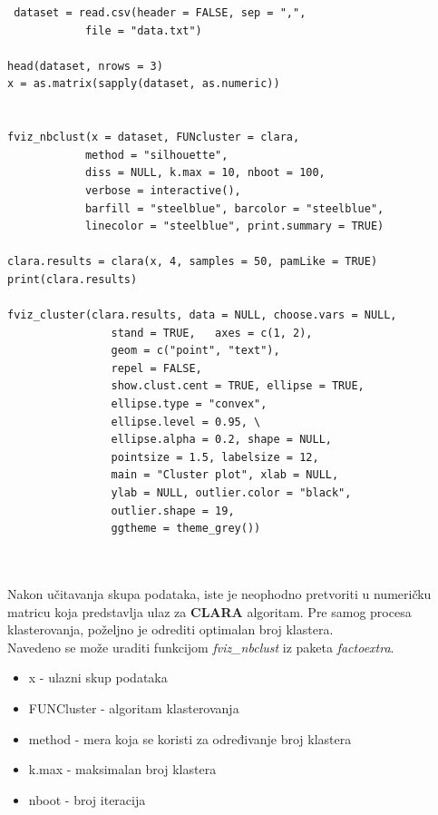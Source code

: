 \documentclass[a4paper]{article}
\begin{document}
\begin{tcolorbox}
\begin{verbatim}
 dataset = read.csv(header = FALSE, sep = ",", 
            file = "data.txt")

head(dataset, nrows = 3)
x = as.matrix(sapply(dataset, as.numeric)) 


fviz_nbclust(x = dataset, FUNcluster = clara, 
            method = "silhouette", 
            diss = NULL, k.max = 10, nboot = 100, 
            verbose = interactive(), 
            barfill = "steelblue", barcolor = "steelblue", 
            linecolor = "steelblue", print.summary = TRUE)

clara.results = clara(x, 4, samples = 50, pamLike = TRUE)
print(clara.results)

fviz_cluster(clara.results, data = NULL, choose.vars = NULL, 
                stand = TRUE,   axes = c(1, 2), 
                geom = c("point", "text"),
                repel = FALSE,
                show.clust.cent = TRUE, ellipse = TRUE, 
                ellipse.type = "convex",
                ellipse.level = 0.95, \
                ellipse.alpha = 0.2, shape = NULL,
                pointsize = 1.5, labelsize = 12, 
                main = "Cluster plot", xlab = NULL,
                ylab = NULL, outlier.color = "black", 
                outlier.shape = 19,
                ggtheme = theme_grey())


\end{verbatim}
\end{tcolorbox}

\\
Nakon učitavanja skupa podataka, iste je neophodno pretvoriti u numeričku matricu koja predstavlja ulaz za \textbf{CLARA} algoritam.
Pre samog procesa klasterovanja, poželjno je odrediti optimalan broj klastera.
\\
Navedeno se može uraditi funkcijom \textit{fviz\_nbclust} iz paketa \textit{factoextra}.

\begin{itemize}
    \item x - ulazni skup podataka
    \item FUNCluster - algoritam klasterovanja
    \item method - mera koja se koristi za određivanje broj klastera
    \item k.max - maksimalan broj klastera
    \item nboot - broj iteracija
\end{itemize}
\end{document}
